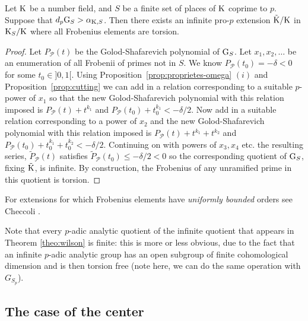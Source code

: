 \documentclass[12pt,a4paper,twoside,english]{smfart}
\def\G{{\rm G}}
\def\K{{\rm K}}
\def\PP{{\mathcal P}}
\begin{document}
\smallskip


\begin{theo} \label{theo:wilson} Let $\K$ be a number field, and $S$ be a finite set of places of $\K$ coprime to $p$.  Suppose  that $d_p \G_S > \alpha_{\K,S}$. Then there exists an  infinite  pro-$p$ extension ${\tilde \K}/\K$ in $\K_S/\K$ where  all Frobenius elements are  torsion. 
\end{theo} 

\begin{proof}

Let $P_\PP(t)$ be the Golod-Shafarevich polynomial of $\G_S$. 
 Let $x_1,x_2,\dots$ be an enumeration of all Frobenii of primes not in $S$. We know  $P_\PP(t_0) =-\delta <0$
for some  $t_0 \in ]0,1[$. Using Proposition~\ref{prop:proprietes-omega} $(i)$ and Proposition~\ref{prop:cutting} we can add in a relation corresponding to a suitable $p$-power of $x_1$ 
so that the new Golod-Shafarevich polynomial with this relation imposed is $P_\PP(t)+t^{k_1}$ and
$P_{\PP }(t_0) + t^{k_1}_0< -\delta/2$.
Now add in  a suitable relation corresponding to a power of $x_2$ and the new Golod-Shafarevich polynomial with this relation imposed is 
$P_\PP(t)+t^{k_1} +t^{k_2}$ and
$P_{\PP }(t_0) + t^{k_1}_0 +t^{k_2}_0< -\delta/2$. Continuing on with powers of $x_3, x_4$ etc.
the resulting series, $\tilde{P}_\PP(t)$ satisfies
$\tilde{P}_\PP(t_0) \leq -\delta/2 < 0 $ so the corresponding quotient of $\G_S$, fixing ${\tilde \K}$,
 is infinite. By construction, the Frobenius of any unramified
prime in this quotient is torsion.
\end{proof}

\begin{rema}  For extensions for which  Frobenius elements  have {\it uniformly bounded} orders
see Checcoli \cite{Checcoli}. 
\end{rema}



\begin{rema}
Note that every $p$-adic analytic quotient of the infinite quotient that appears in Theorem \ref{theo:wilson} is finite: this is more or less obvious, due to the fact that an infinite $p$-adic analytic group has an open subgroup of finite cohomological dimension and is then torsion free (note here, we can do the same operation with $G_{S_p}$). 
\end{rema}

\subsection{The case of the center}
\end{document}

